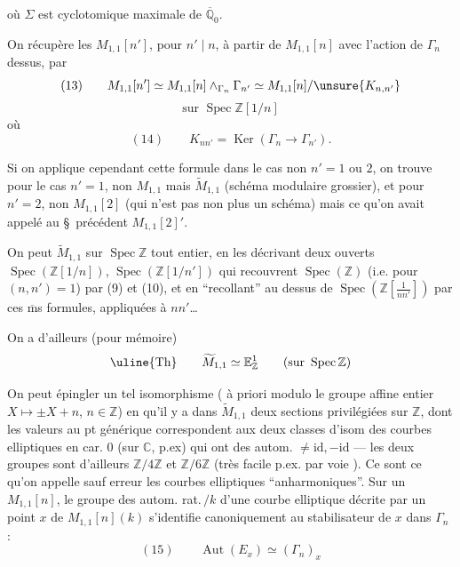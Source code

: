 
 où $\Sigma$  est  cyclotomique maximale de $\overline{\mathbb Q}_0$.

 On récupère les $M_{1,1}[n']$, pour $n'\mid n$,  à partir de $M_{1,1}[n]$ avec l'action de $\Gamma_n$ dessus, par
\[
(13)\qquad M_{1,1}[n']\simeq M_{1,1}[n]\wedge_{\Gamma_n}\Gamma_{n'}\simeq M_{1,1}[n]/\unsure{K_{n,n'}}
\]
\[
\text{sur }\operatorname{Spec}\mathbb Z[1/n]
\]
où
\[
(14)\qquad K_{nn'}=\operatorname{Ker}(\Gamma_n\longrightarrow\Gamma_{n'}).
\]


Si on applique cependant cette formule dans le cas non  $n'=1$ ou $2$, on trouve pour le cas $n'=1$, non $M_{1,1}$ mais $\widetilde M_{1,1}$ (schéma modulaire grossier), et pour $n'=2$, non $M_{1,1}[2]$ (qui n'est pas non plus un schéma) mais ce qu'on avait appelé au \S\ précédent $M_{1,1}[2]'$.

On peut    $\widetilde M_{1,1}$ sur $\operatorname{Spec}\mathbb Z$ tout entier,  en les décrivant   deux ouverts $\operatorname{Spec}(\mathbb Z[1/n])$, $\operatorname{Spec}(\mathbb Z[1/n'])$ qui recouvrent $\operatorname{Spec}(\mathbb Z)$ (i.e. pour $(n,n')=1$) par (9) et (10),  et en ``recollant''  au dessus de $\operatorname{Spec}(\mathbb Z[\frac{1}{nn'}])$ par ces $\overline{\mathrm m}$s formules, appliquées à $nn'$\ldots


On a d'ailleurs (pour mémoire)
\[
\text{\uline{Th}}\qquad \widetilde M_{1,1}\simeq\mathbb E^1_{\mathbb Z}\qquad(\text{sur }\operatorname{Spec}\mathbb Z)
\]

On peut épingler un tel isomorphisme ( à priori modulo le groupe affine entier $X\longmapsto\pm X+n$, $n\in\mathbb Z$) en  qu'il y a dans $\widetilde M_{1,1}$ deux sections privilégiées sur $\mathbb Z$, dont les valeurs au pt générique correspondent aux deux classes d'isom des courbes elliptiques en car. $0$ (sur $\mathbb C$, p.ex) qui ont des autom. $\ne\mathrm{id},-\mathrm{id}$ --- les deux groupes   sont d'ailleurs $\mathbb Z/4\mathbb Z$ et $\mathbb Z/6\mathbb Z$ (très facile p.ex. par voie ). Ce sont ce qu'on appelle sauf erreur les courbes elliptiques ``anharmoniques''. Sur un $M_{1,1}[n]$, le groupe des autom. rat.\,$/k$ d'une courbe elliptique décrite par un point $x$ de $M_{1,1}[n](k)$ s'identifie canoniquement au stabilisateur de $x$ dans $\Gamma_n$ :
\[
(15)\qquad\operatorname{Aut}(E_x)\simeq(\Gamma_n)_x
\]

